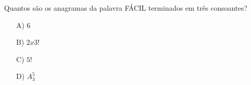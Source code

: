 Quantos são os anagramas da palavra FÁCIL terminados em três consoantes?
\begin{enumerate}
\item [A)] $6$
\item [B)] $2x3!$
\item [C)] $5!$
\item [D)] $A^5_3$
\end{enumerate}

